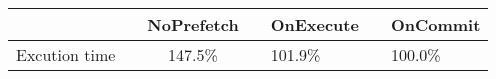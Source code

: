 \begin{tabular}{ l| c | c | c}
&& NoPrefetch && OnExecute && OnCommit\\ \hline
Excution time && 147.5\% && 101.9\% && 100.0\%\\ \hline
\end{tabular}
